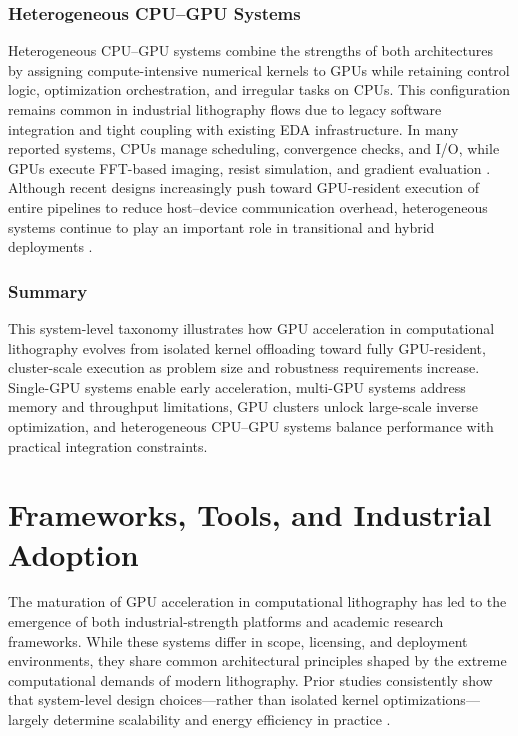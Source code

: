 \documentclass[pdflatex,sn-mathphys-num]{sn-jnl}%
\theoremstyle{thmstyleone}%
\theoremstyle{thmstyletwo}%
\theoremstyle{thmstylethree}%
\begin{document}
\subsubsection{Heterogeneous CPU–GPU Systems}
Heterogeneous CPU–GPU systems combine the strengths of both architectures by assigning compute-intensive numerical kernels to GPUs while retaining control logic, optimization orchestration, and irregular tasks on CPUs. This configuration remains common in industrial lithography flows due to legacy software integration and tight coupling with existing EDA infrastructure. In many reported systems, CPUs manage scheduling, convergence checks, and I/O, while GPUs execute FFT-based imaging, resist simulation, and gradient evaluation \cite{yang2024gpuacceleratedinverselithographyhigh}. Although recent designs increasingly push toward GPU-resident execution of entire pipelines to reduce host–device communication overhead, heterogeneous systems continue to play an important role in transitional and hybrid deployments \cite{Zheng2023}.


\subsubsection{Summary}
This system-level taxonomy illustrates how GPU acceleration in computational lithography evolves from isolated kernel offloading toward fully GPU-resident, cluster-scale execution as problem size and robustness requirements increase. Single-GPU systems enable early acceleration, multi-GPU systems address memory and throughput limitations, GPU clusters unlock large-scale inverse optimization, and heterogeneous CPU–GPU systems balance performance with practical integration constraints.


\section{Frameworks, Tools, and Industrial Adoption}
The maturation of GPU acceleration in computational lithography has led to the emergence of both industrial-strength platforms and academic research frameworks. While these systems differ in scope, licensing, and deployment environments, they share common architectural principles shaped by the extreme computational demands of modern lithography. Prior studies consistently show that system-level design choices—rather than isolated kernel optimizations—largely determine scalability and energy efficiency in practice \cite{yang2024gpuacceleratedinverselithographyhigh,Zheng2023}.
\end{document}
